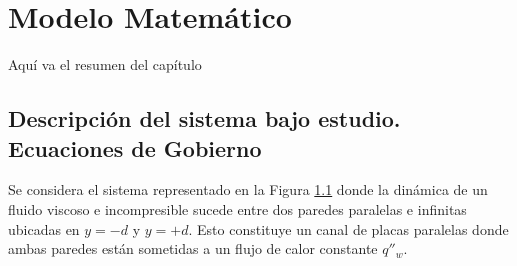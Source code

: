 \chapter{Modelo Matemático}

Aquí va el resumen del capítulo

\newpage
\section{Descripción del sistema bajo estudio. Ecuaciones de Gobierno}

Se considera el sistema representado en la Figura \ref{fig:sistem_domain} donde la dinámica de un fluido viscoso e incompresible sucede entre dos paredes paralelas e infinitas ubicadas en $y=-d$ y $y=+d$. Esto constituye un canal de placas paralelas donde ambas paredes están sometidas a un flujo de calor constante $q''_w$.

\begin{figure}[H]
 \centering
 \caption{} 
 \label{fig:sistem_domain}
\end{figure}



